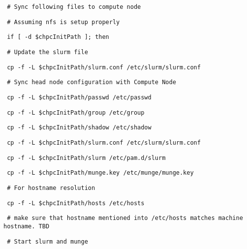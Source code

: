\documentclass[12pt]{article}
\begin{document}
\begin{bash}\texttt{\small{ \# Sync following files to compute node}}\end{bash}
\begin{bash}\texttt{\small{ \# Assuming nfs is setup properly}}\end{bash}
\begin{bash}\texttt{\small{ if [ -d \$chpcInitPath ]; then}}\end{bash}
\begin{bash}\texttt{\small{     \# Update the slurm file}}\end{bash}
\begin{bash}\texttt{\small{     cp -f -L \$chpcInitPath/slurm.conf /etc/slurm/slurm.conf}}\end{bash}
\begin{bash}\texttt{\small{     \# Sync head node configuration with Compute Node}}\end{bash}
\begin{bash}\texttt{\small{     cp -f -L \$chpcInitPath/passwd /etc/passwd}}\end{bash}
\begin{bash}\texttt{\small{     cp -f -L \$chpcInitPath/group /etc/group}}\end{bash}
\begin{bash}\texttt{\small{     cp -f -L \$chpcInitPath/shadow /etc/shadow}}\end{bash}
\begin{bash}\texttt{\small{     cp -f -L \$chpcInitPath/slurm.conf /etc/slurm/slurm.conf}}\end{bash}
\begin{bash}\texttt{\small{     cp -f -L \$chpcInitPath/slurm /etc/pam.d/slurm}}\end{bash}
\begin{bash}\texttt{\small{     cp -f -L \$chpcInitPath/munge.key /etc/munge/munge.key}}\end{bash}
\begin{bash}\texttt{\small{     \# For hostname resolution}}\end{bash}
\begin{bash}\texttt{\small{     cp -f -L \$chpcInitPath/hosts /etc/hosts}}\end{bash}
\begin{bash}\texttt{\small{     \# make sure that hostname mentioned into /etc/hosts matches machine hostname. TBD}}\end{bash}
\begin{bash}\texttt{\small{     \# Start slurm and munge }}\end{bash}
\end{document}
